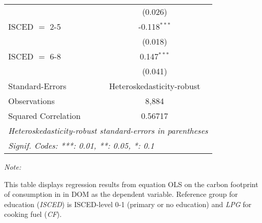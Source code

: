 \begin{table}[htbp!]
\begin{adjustbox}{width = 1\textwidth, max height = 0.95\textheight, center}
\begin{threeparttable}[b]
\begin{tabular}{lc}
                                & (0.026)\\   
            ISCED $=$ 2-5       & -0.118$^{***}$\\   
                                & (0.018)\\   
            ISCED $=$ 6-8       & 0.147$^{***}$\\   
                                & (0.041)\\   
            \midrule 
            Standard-Errors     & Heteroskedasticity-robust \\   
            Observations        & 8,884\\  
            Squared Correlation & 0.56717\\  
            \midrule \midrule
            \multicolumn{2}{l}{\emph{Heteroskedasticity-robust standard-errors in parentheses}}\\
            \multicolumn{2}{l}{\emph{Signif. Codes: ***: 0.01, **: 0.05, *: 0.1}}\\
         \end{tabular}
         
         \begin{tablenotes}\item \medskip \textit{Note:}
            \item This table displays regression results from equation OLS on the carbon footprint of consumption in  in DOM as the dependent variable.  Reference group for education (\textit{ISCED}) is ISCED-level 0-1 (primary or no education) and \textit{LPG} for cooking fuel (\textit{CF}).
         \end{tablenotes}
      \end{threeparttable}
   \end{adjustbox}
\end{table}


